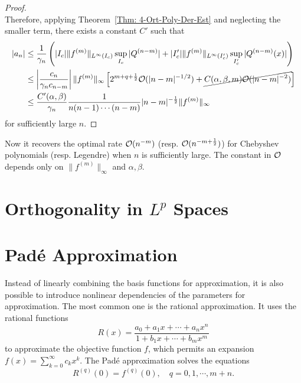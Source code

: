 \begin{proof}
\begin{equation}
    \end{equation}
    Therefore, applying Theorem~\ref{Thm: 4-Ort-Poly-Der-Est} and neglecting the smaller term, there exists a constant $C'$ such that
    \begin{equation}
    \begin{aligned}
    |a_n| &\le \frac{1}{\gamma_n}  \left( |I_c|\|f^{(m)}\|_{L^{\infty}(I_c)} \sup_{I_c} |Q^{(n-m)}| + |I_c'|\|f^{(m)}\|_{L^{\infty}(I_c')} \sup_{I_c'} |Q^{(n-m)}(x)| \right) \\
    &\le\left| \frac{c_n}{\gamma_n c_{n-m}} \right|\|f^{(m)}\|_{\infty} \left[  2^{m+q+\frac{1}{2}}\mathcal O(|n-m|^{-1/2})   + \cancel{C(\alpha,\beta, m)\mathcal O(|n-m|^{-2})}\right]\\
    &\le \frac{C'(\alpha, \beta)}{\gamma_n} \frac{1}{n(n-1)\cdots (n-m)}|n-m|^{-\frac{1}{2}} \|f^{(m)}\|_{\infty}
    \end{aligned}
    \end{equation}
    for sufficiently large $n$. 
\end{proof}
\begin{remark}
    Now it recovers the optimal rate $\mathcal O(n^{-m})$ (resp. $\mathcal O(n^{-m+\frac{1}{2}})$) for Chebyshev polynomials (resp. Legendre) when $n$ is sufficiently large. The constant in $\mathcal O$ depends only on $\|f^{(m)}\|_{\infty}$ and $\alpha, \beta$.
\end{remark}
\section{Orthogonality in \texorpdfstring{$L^p$} - Spaces}
\section{Pad\'e Approximation}
Instead of linearly combining the basis functions for approximation, it is also possible to introduce nonlinear dependencies of the parameters for approximation. The most common one is the rational approximation. It uses the rational functions 
\begin{equation}
    R(x) = \frac{a_0 + a_1 x + \cdots + a_n x^n}{1 + b_1 x + \cdots + b_m x^m}
\end{equation}
to approximate the objective function $f$, which permits an expansion $f(x) = \sum_{k=0}^{\infty} c_k x^k$. The Pad\'e approximation solves the equations 
\begin{equation}
    R^{(q)}(0) = f^{(q)}(0),\quad q = 0, 1, \cdots, m+n.
\end{equation}

